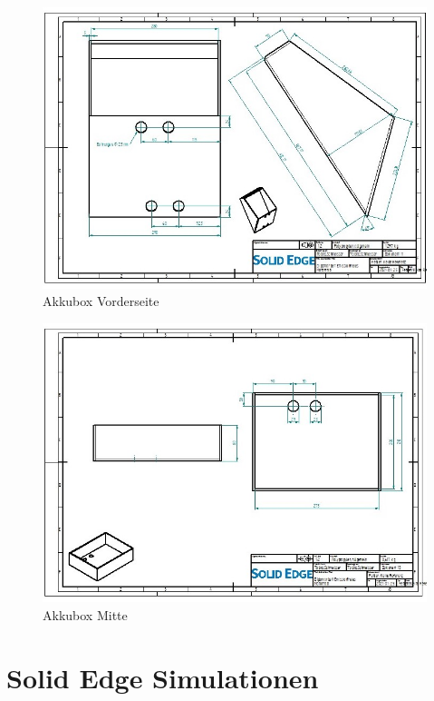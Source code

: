 \begin{figure} [H]
	\begin{center}
		\includegraphics[angle=90]{figures/mechanik/Box_2_Zeichnung.jpg}
		\caption{Akkubox Vorderseite}
		\label{fig:Akkubox Vorderseite}
	\end{center}
\end{figure}


\begin{figure} [H]
	\begin{center}
		\includegraphics[angle=90]{figures/mechanik/Box_3_Zeichnung.jpg}
		\caption{Akkubox Mitte}
		\label{fig:Akkubox Mitte}
	\end{center}
\end{figure}

\chapter{Solid Edge Simulationen}

